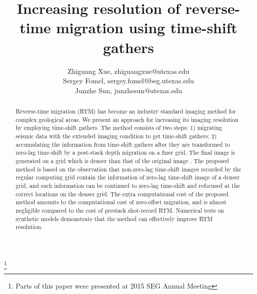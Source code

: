 \title{Increasing resolution of reverse-time migration using time-shift gathers}
\author{Zhiguang Xue, zhiguangxue@utexas.edu \\
Sergey Fomel, sergey.fomel@beg.utexas.edu \\
Junzhe Sun, junzhesun@utexas.edu}
\maketitle

\address{
Bureau of Economic Geology \\
John A. and Katherine G. Jackson School of Geosciences \\
The University of Texas at Austin \\
University Station, Box X \\
Austin, TX 78713-8924 \\
}

\footnote{Parts of this paper were presented at 2015 SEG Annual Meeting}


\begin{abstract}
	Reverse-time migration (RTM) has become an industry standard imaging method for complex geological areas.
	We present an approach for increasing its imaging resolution by employing time-shift gathers.
	The method consists of two steps: 1) migrating seismic data with the extended imaging condition to get time-shift gathers;
	2) accumulating the information from time-shift gathers
	after they are transformed to zero-lag time-shift by a post-stack depth migration on a finer grid.
	The final image is generated on a grid which is denser than that of the original image .
	The proposed method is based on the observation that non-zero-lag time-shift images recorded by the regular computing grid
	contain the information of zero-lag time-shift image of a denser grid, and such information
	can be continued to zero-lag time-shift and refocused at the correct locations on the denser grid.
	The extra computational cost of the proposed method amounts to the computational cost of zero-offset migration,
	and is almost negligible compared to the cost of prestack shot-record RTM.
	Numerical tests on synthetic models demonstrate that the method can effectively improve RTM resolution.
\end{abstract}

